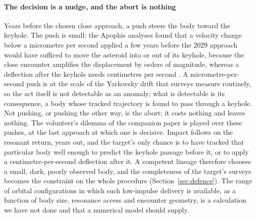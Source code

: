 \documentclass[preprint,12pt]{elsarticle}
\theoremstyle{definition}
\begin{document}
\paragraph{The decision is a nudge, and the abort is nothing} Years before the chosen close approach, a push steers the body toward the keyhole. The push is small: the Apophis analyses found that a velocity change below a micrometre per second applied a few years before the 2029 approach would have sufficed to move the asteroid into or out of its keyhole, because the close encounter amplifies the displacement by orders of magnitude, whereas a deflection after the keyhole needs centimetres per second \citep{Chesley2006,Wiegert2024}. A micrometre-per-second push is at the scale of the Yarkovsky drift that surveys measure routinely, so the act itself is not detectable as an anomaly; what is detectable is its consequence, a body whose tracked trajectory is found to pass through a keyhole. Not pushing, or pushing the other way, is the abort; it costs nothing and leaves nothing. The volunteer's dilemma of the companion paper is played over these pushes, at the last approach at which one is decisive. Impact follows on the resonant return, years out, and the target's only chance is to have tracked that particular body well enough to predict the keyhole passage before it, or to apply a centimetre-per-second deflection after it. A competent lineage therefore chooses a small, dark, poorly observed body, and the completeness of the target's surveys becomes the constraint on the whole procedure (Section~\ref{sec:defence}). The range of orbital configurations in which such low-impulse delivery is available, as a function of body size, resonance access and encounter geometry, is a calculation we have not done and that a numerical model should supply.
\end{document}
